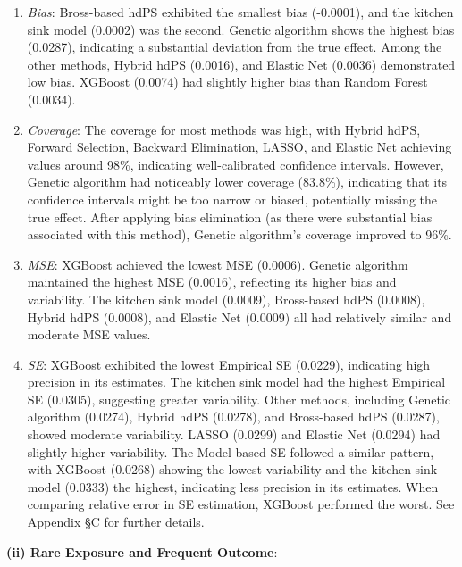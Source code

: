 \documentclass[10pt,letterpaper]{article}
\begin{document}
\begin{enumerate}
\def\labelenumi{\arabic{enumi}.}
\item
  \emph{Bias}: Bross-based hdPS exhibited the smallest bias (-0.0001),
  and the kitchen sink model (0.0002) was the second. Genetic algorithm
  shows the highest bias (0.0287), indicating a substantial deviation
  from the true effect. Among the other methods, Hybrid hdPS (0.0016),
  and Elastic Net (0.0036) demonstrated low bias. XGBoost (0.0074) had
  slightly higher bias than Random Forest (0.0034).
\item
  \emph{Coverage}: The coverage for most methods was high, with Hybrid
  hdPS, Forward Selection, Backward Elimination, LASSO, and Elastic Net
  achieving values around 98\%, indicating well-calibrated confidence
  intervals. However, Genetic algorithm had noticeably lower coverage
  (83.8\%), indicating that its confidence intervals might be too narrow
  or biased, potentially missing the true effect. After applying bias
  elimination (as there were substantial bias associated with this
  method), Genetic algorithm's coverage improved to 96\%.
\item
  \emph{MSE}: XGBoost achieved the lowest MSE (0.0006). Genetic
  algorithm maintained the highest MSE (0.0016), reflecting its higher
  bias and variability. The kitchen sink model (0.0009), Bross-based
  hdPS (0.0008), Hybrid hdPS (0.0008), and Elastic Net (0.0009) all had
  relatively similar and moderate MSE values.
\item
  \emph{SE}: XGBoost exhibited the lowest Empirical SE (0.0229),
  indicating high precision in its estimates. The kitchen sink model had
  the highest Empirical SE (0.0305), suggesting greater variability.
  Other methods, including Genetic algorithm (0.0274), Hybrid hdPS
  (0.0278), and Bross-based hdPS (0.0287), showed moderate variability.
  LASSO (0.0299) and Elastic Net (0.0294) had slightly higher
  variability. The Model-based SE followed a similar pattern, with
  XGBoost (0.0268) showing the lowest variability and the kitchen sink
  model (0.0333) the highest, indicating less precision in its
  estimates. When comparing relative error in SE estimation, XGBoost
  performed the worst. See Appendix \S C for further details.
\end{enumerate}

\textbf{(ii) Rare Exposure and Frequent Outcome}:
\end{document}
